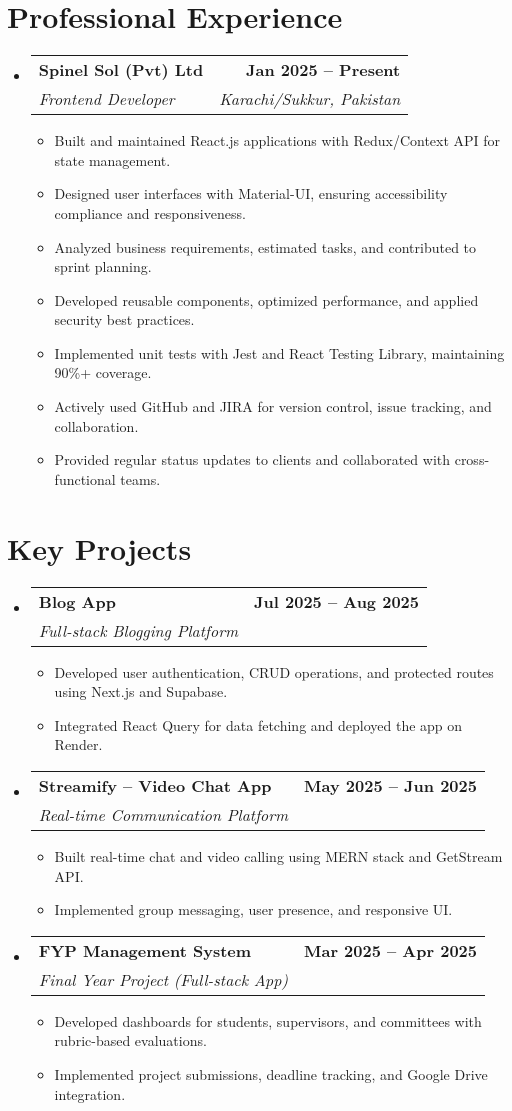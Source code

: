 \documentclass[letterpaper,11pt]{article}
\makeatletter
\newcommand{\resumeItem}[1]{\item\small{{#1 \vspace{-2pt}}}}
\newcommand{\resumeSubheading}[4]{\vspace{-2pt}\item
  \begin{tabular*}{1.0\textwidth}[t]{l@{\extracolsep{\fill}}r}
    \textbf{#1} & \textbf{\small #2} \\
    \textit{\small#3} & \textit{\small #4} \\
  \end{tabular*}\vspace{-7pt}}
\newcommand{\resumeSubHeadingListStart}{\begin{itemize}[leftmargin=0.0in, label={}]}
\newcommand{\resumeSubHeadingListEnd}{\end{itemize}}
\newcommand{\resumeItemListStart}{\begin{itemize}}
\newcommand{\resumeItemListEnd}{\end{itemize}\vspace{-5pt}}
\makeatother
\begin{document}
\section{Professional Experience}
\resumeSubHeadingListStart
  \resumeSubheading
    {Spinel Sol (Pvt) Ltd}{Jan 2025 – Present}
    {Frontend Developer}{Karachi/Sukkur, Pakistan}
    \resumeItemListStart
      \resumeItem{Built and maintained React.js applications with Redux/Context API for state management.}
      \resumeItem{Designed user interfaces with Material-UI, ensuring accessibility compliance and responsiveness.}
      \resumeItem{Analyzed business requirements, estimated tasks, and contributed to sprint planning.}
      \resumeItem{Developed reusable components, optimized performance, and applied security best practices.}
      \resumeItem{Implemented unit tests with Jest and React Testing Library, maintaining 90\%+ coverage.}
      \resumeItem{Actively used GitHub and JIRA for version control, issue tracking, and collaboration.}
      \resumeItem{Provided regular status updates to clients and collaborated with cross-functional teams.}
    \resumeItemListEnd
\resumeSubHeadingListEnd

\section{Key Projects}
\resumeSubHeadingListStart
  \resumeSubheading
    {Blog App}{Jul 2025 – Aug 2025}
    {Full-stack Blogging Platform}{}
    \resumeItemListStart
      \resumeItem{Developed user authentication, CRUD operations, and protected routes using Next.js and Supabase.}
      \resumeItem{Integrated React Query for data fetching and deployed the app on Render.}
    \resumeItemListEnd

  \resumeSubheading
    {Streamify – Video Chat App}{May 2025 – Jun 2025}
    {Real-time Communication Platform}{}
    \resumeItemListStart
      \resumeItem{Built real-time chat and video calling using MERN stack and GetStream API.}
      \resumeItem{Implemented group messaging, user presence, and responsive UI.}
    \resumeItemListEnd

  \resumeSubheading
    {FYP Management System}{Mar 2025 – Apr 2025}
    {Final Year Project (Full-stack App)}{}
    \resumeItemListStart
      \resumeItem{Developed dashboards for students, supervisors, and committees with rubric-based evaluations.}
      \resumeItem{Implemented project submissions, deadline tracking, and Google Drive integration.}
    \resumeItemListEnd
\resumeSubHeadingListEnd
\end{document}
